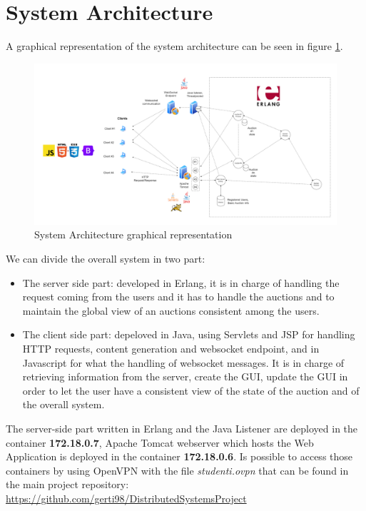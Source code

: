\section{System Architecture}
\noindent A graphical representation of the system architecture can be seen in figure \ref{fig:architecture}.

\begin{figure}[H]
	\centering
	\includegraphics[width=1\linewidth]{img/systemStructure2.png}
	\caption{System Architecture graphical representation}
	\label{fig:architecture}
\end{figure}

\noindent We can divide the overall system in two part:
\begin{itemize}
	\item The server side part: developed in Erlang, it is in charge of handling the request coming from the users and it has to handle the auctions and to maintain the global view of an auctions consistent among the users.
	
	\item The client side part: depeloved in Java, using Servlets and JSP for handling HTTP requests, content generation and websocket endpoint, and in Javascript for what the handling of websocket messages. It is in charge of retrieving information from the server, create the GUI, update the GUI in order to let the user have a consistent view of the state of the auction and of the overall system.
\end{itemize}

The server-side part written in Erlang and the Java Listener are deployed in the container \textbf{172.18.0.7}, Apache Tomcat webserver which hosts the Web Application is deployed in the container \textbf{172.18.0.6}.
Is possible to access those containers by using OpenVPN with the file \textit{studenti.ovpn} that can be found
in the main project repository: \\
\url{https://github.com/gerti98/DistributedSystemsProject}
	
